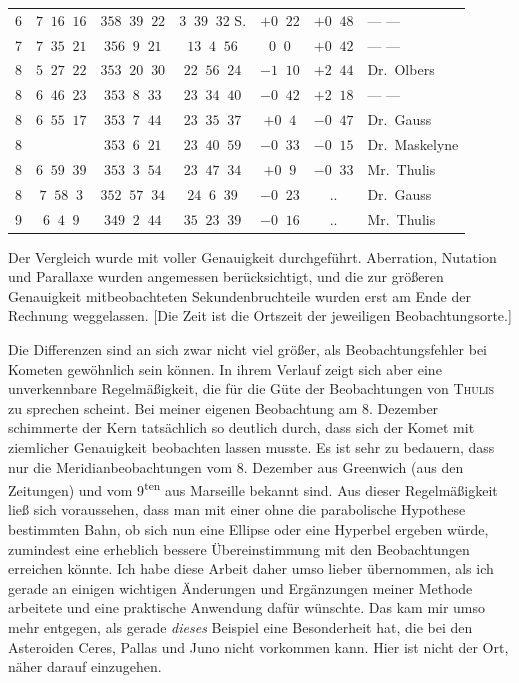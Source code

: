 \begin{center}
\begin{tabular}{|c|c|c|c|c|c|l|}
6 & $7\;\;16\;\;16$ & $358\;\;39\;\;22$ & $3\;\;39\;\;32$ S. & $+0\;\;22$ & $+0\;\;48$ & --- --- \\
7 & $7\;\;35\;\;21$ & $356\;\;9\;\;21$ & $13\;\;4\;\;56$ & $0\;\;0$ & $+0\;\;42$ & --- --- \\
8 & $5\;\;27\;\;22$ & $353\;\;20\;\;30$ & $22\;\;56\;\;24$ & $-1\;\;10$ & $+2\;\;44$ & Dr.\ Olbers \\
8 & $6\;\;46\;\;23$ & $353\;\;8\;\;33$ & $23\;\;34\;\;40$ & $-0\;\;42$ & $+2\;\;18$ & --- --- \\
8 & $6\;\;55\;\;17$ & $353\;\;7\;\;44$ & $23\;\;35\;\;37$ & $+0\;\;4$ & $-0\;\;47$ & Dr.\ Gauss \\
8 & & $353\;\;6\;\;21$ & $23\;\;40\;\;59$ & $-0\;\;33$ & $-0\;\;15$ & Dr.\ Maskelyne \\
8 & $6\;\;59\;\;39$ & $353\;\;3\;\;54$ & $23\;\;47\;\;34$ & $+0\;\;9$ & $-0\;\;33$ & Mr.\ Thulis \\
8 & $7\;\;58\;\;3$ & $352\;\;57\;\;34$ & $24\;\;6\;\;39$ & $-0\;\;23$ & .\quad . & Dr.\ Gauss \\
9 & $6\;\;4\;\;9$ & $349\;\;2\;\;44$ & $35\;\;23\;\;39$ & $-0\;\;16$ & .\quad . & Mr.\ Thulis \\
\hline
\end{tabular}\endgroup\end{center}



\par\indent Der Vergleich wurde mit voller Genauigkeit durchgeführt. Aberration, Nutation und Parallaxe wurden angemessen
%
berücksichtigt, und die zur größeren Genauigkeit mitbeobachteten Sekundenbruchteile wurden erst am Ende der Rechnung weggelassen. [Die Zeit ist die Ortszeit der jeweiligen Beobachtungsorte.]

\par\indent Die Differenzen sind an sich zwar nicht viel größer, als Beobachtungsfehler bei Kometen gewöhnlich sein können. In ihrem Verlauf zeigt sich aber eine unverkennbare Regelmäßigkeit, die für die Güte der Beobachtungen von \textsc{Thulis} zu sprechen scheint. Bei meiner eigenen Beobachtung am 8. Dezember schimmerte der Kern tatsächlich so deutlich durch, dass sich der Komet mit ziemlicher Genauigkeit beobachten lassen musste. Es ist sehr zu bedauern, dass nur die Meridianbeobachtungen vom 8. Dezember aus Greenwich (aus den Zeitungen) und vom 9\textsuperscript{ten} aus Marseille bekannt sind. Aus dieser Regelmäßigkeit ließ sich voraussehen, dass man mit einer ohne die parabolische Hypothese bestimmten Bahn, ob sich nun eine Ellipse oder eine Hyperbel ergeben würde, zumindest eine erheblich bessere Übereinstimmung mit den Beobachtungen erreichen könnte. Ich habe diese Arbeit daher umso lieber übernommen, als ich gerade an einigen wichtigen Änderungen und Ergänzungen meiner Methode arbeitete und eine praktische Anwendung dafür wünschte. Das kam mir umso mehr entgegen, als gerade \emph{dieses} Beispiel eine Besonderheit hat, die bei den Asteroiden Ceres, Pallas und Juno nicht vorkommen kann. Hier ist nicht der Ort, näher darauf einzugehen.

